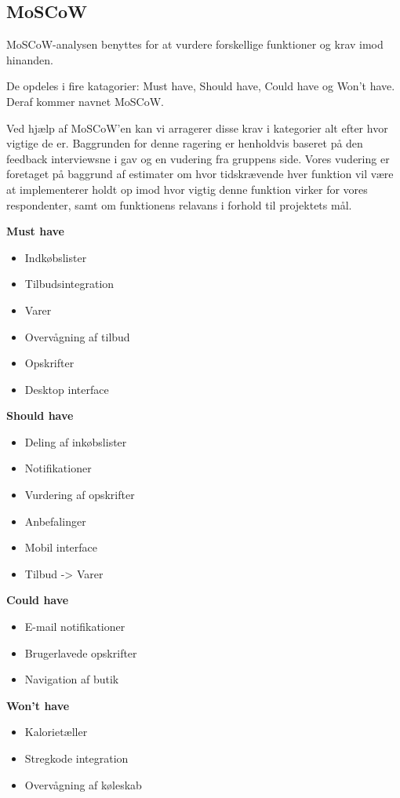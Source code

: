 \subsection{MoSCoW}
MoSCoW-analysen benyttes for at vurdere forskellige funktioner og krav imod hinanden.

De opdeles i fire katagorier: Must have, Should have, Could have og Won't have.
Deraf kommer navnet MoSCoW.

Ved hjælp af MoSCoW'en kan vi arragerer disse krav i kategorier alt efter hvor vigtige de er.
Baggrunden for denne ragering er henholdvis baseret på den feedback interviewsne i  gav og en vudering fra gruppens side.
Vores vudering er foretaget på baggrund af estimater om hvor tidskrævende hver funktion vil være at implementerer holdt op imod hvor vigtig denne funktion virker for vores respondenter, samt om funktionens relavans i forhold til projektets mål.


\noindent\parbox[t]{2.7in}{\raggedright
	\textbf{Must have}
	\begin{itemize}
			\item Indkøbslister
			\item Tilbudsintegration
			\item Varer
			\item Overvågning af tilbud
			\item Opskrifter
			\item Desktop interface
	\end{itemize}
}
\parbox[t]{2.7in}{\raggedright%
	\textbf{Should have}
	\begin{itemize}
		\item Deling af inkøbslister
		\item Notifikationer
		\item Vurdering af opskrifter
		\item Anbefalinger
		\item Mobil interface
		\item Tilbud -> Varer
	\end{itemize}
}

\noindent\parbox[t]{2.7in}{\raggedright
	\textbf{Could have}
	\begin{itemize}
			\item E-mail notifikationer
			\item Brugerlavede opskrifter
			\item Navigation af butik
	\end{itemize}
}
\parbox[t]{2.7in}{\raggedright%
	\textbf{Won't have}
	\begin{itemize}
		\item Kalorietæller
		\item Stregkode integration
		\item Overvågning af køleskab
	\end{itemize}
}
